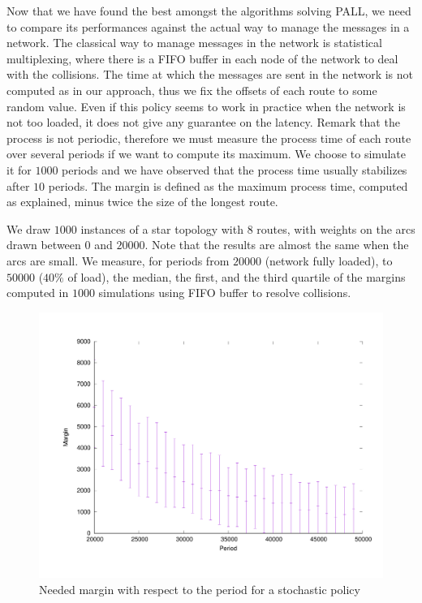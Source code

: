 \documentclass[a4paper,10pt]{article}
\begin{document}
     
     
     Now that we have found the best amongst the algorithms solving PALL, we need to compare its performances against the actual way to manage the messages in a network. The classical way to manage messages in the network is statistical multiplexing, where there is a FIFO buffer in each node of the network to deal with the collisions. The time at which the messages are sent in the network is not computed as in our approach, thus we fix the offsets of each route to some random value.
     Even if this policy seems to work in practice when the network is not too loaded, it does not give any guarantee on the latency. Remark that the process is not periodic, therefore we must measure the process time of each route over several periods if we want to compute its maximum. We choose to simulate it for $1000$ periods and we have observed that the process time usually stabilizes after $10$ periods. The margin is defined as the maximum process time, computed as explained, minus twice the size of the longest route. 
	    
     
     We draw $1000$ instances of a star topology with $8$ routes, with weights on the arcs drawn between $0$ and $20000$. Note that the results are almost the same when the arcs are small. We measure, for periods from $20000$ (network fully loaded), to $50000$ ($40 \%$ of load), the median, the first, and the third quartile of the margins computed in $1000$ simulations using FIFO buffer to resolve collisions.
     
      
    \begin{figure}[H] 

       \begin{center}
      \includegraphics[scale=0.4]{stochastic.pdf}
      \end{center}
      \caption{Needed margin with respect to the period for a stochastic policy}
      \label{fig:sto}
     \end{figure}
     
\end{document}
